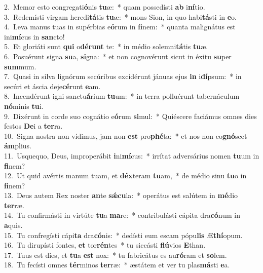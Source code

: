 {2.~}Memor esto congregati\textbf{ó}nis \textbf{tu}æ:~* quam possedísti \textbf{ab} i\textbf{ní}tio.\\
{3.~}Redemísti virgam heredi\textbf{tá}tis \textbf{tu}æ:~* mons Sion, in quo habi\textbf{tá}sti in \textbf{e}o.\\
{4.~}Leva manus tuas in supérbias e\textbf{ó}rum in \textbf{fi}nem:~* quanta malignátus est ini\textbf{mí}cus in \textbf{san}cto!\\
{5.~}Et gloriáti sunt \textbf{qui} o\textbf{dé}\textbf{runt} te:~* in médio solemni\textbf{tá}tis \textbf{tu}æ.\\
{6.~}Posuérunt signa \textbf{su}a, \textbf{si}gna:~* et non cognovérunt sicut in éxitu \textbf{su}per \textbf{sum}mum.\\
{7.~}Quasi in silva lignórum secúribus excidérunt jánuas ejus \textbf{in} i\textbf{dí}psum:~* in secúri et áscia deje\textbf{cé}runt \textbf{e}am.\\
{8.~}Incendérunt igni sanctu\textbf{á}rium \textbf{tu}um:~* in terra polluérunt tabernáculum \textbf{nó}minis \textbf{tu}i.\\
{9.~}Dixérunt in corde suo cognátio e\textbf{ó}rum \textbf{si}mul:~* Quiéscere faciámus omnes dies festos \textbf{De}i a \textbf{ter}ra.\\
{10.~}Signa nostra non vídimus, jam non \textbf{est} pro\textbf{phé}ta:~* et nos non co\textbf{gnó}scet \textbf{ám}plius.\\
{11.~}Usquequo, Deus, improperábit \textbf{i}ni\textbf{mí}cus:~* irrítat adversárius nomen \textbf{tu}um in \textbf{fi}nem?\\
{12.~}Ut quid avértis manum tuam, et \textbf{déx}teram \textbf{tu}am,~* de médio sinu \textbf{tu}o in \textbf{fi}nem?\\
{13.~}Deus autem Rex noster \textbf{an}te \textbf{sǽ}\textbf{cu}la:~* operátus est salútem in \textbf{mé}dio \textbf{ter}ræ.\\
{14.~}Tu confirmásti in virtúte \textbf{tu}a \textbf{ma}re:~* contribulásti cápita dra\textbf{có}num in \textbf{a}quis.\\
{15.~}Tu confregísti cápi\textbf{ta} dra\textbf{có}nis:~* dedísti eum escam pópu\textbf{lis} Æ\textbf{thí}opum.\\
{16.~}Tu dirupísti fontes, \textbf{et} tor\textbf{rén}tes~* tu siccásti \textbf{flú}vios \textbf{E}than.\\
{17.~}Tuus est dies, et \textbf{tu}a \textbf{est} nox:~* tu fabricátus es au\textbf{ró}ram et \textbf{so}lem.\\
{18.~}Tu fecísti omnes \textbf{tér}minos \textbf{ter}ræ:~* æstátem et ver tu plas\textbf{má}sti \textbf{e}a.\\
